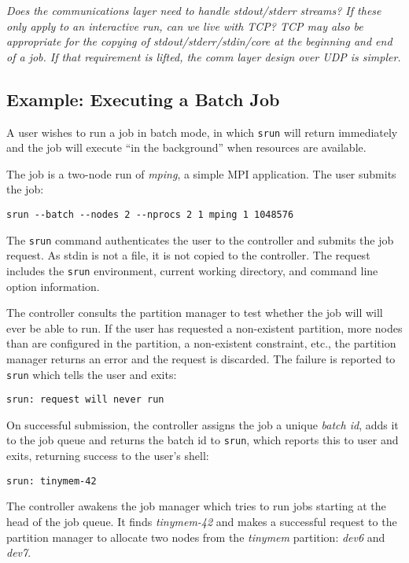 {\em Does the communications layer need to handle stdout/stderr streams?
If these only apply to an interactive run, can we live with TCP?
TCP may also be appropriate for the copying of stdout/stderr/stdin/core
at the beginning and end of a job.  If that requirement is lifted,
the comm layer design over UDP is simpler.}

\subsection{Example:  Executing a Batch Job}

A user wishes to run a job in batch mode, in which {\tt srun} will return 
immediately and the job will execute ``in the background'' when resources
are available.

The job is a two-node run of {\em mping}, a simple MPI application.
The user submits the job:
\begin{verbatim}
srun --batch --nodes 2 --nprocs 2 1 mping 1 1048576
\end{verbatim}

The {\tt srun} command authenticates the user to the controller and submits
the job request.  As stdin is not a file, it is not copied to the controller.
The request includes the {\tt srun} environment, current working directory, 
and command line option information.

The controller consults the partition manager to test whether the job will
will ever be able to run.  If the user has requested a non-existent partition,
more nodes than are configured in the partition, a non-existent constraint, 
etc., the partition manager returns an error and the request is discarded.
The failure is reported to {\tt srun} which tells the user and exits:
\begin{verbatim}
srun: request will never run
\end{verbatim}

On successful submission, the controller assigns the job a unique 
{\em batch id}, adds it to the job queue and returns the 
batch id to {\tt srun}, which reports this to user and exits, returning
success to the user's shell:

\begin{verbatim}
srun: tinymem-42
\end{verbatim}

The controller awakens the job manager which tries to run
jobs starting at the head of the job queue.  It finds {\em tinymem-42}
and makes a successful request to the partition manager to allocate 
two nodes from the {\em tinymem} partition: {\em dev6} and {\em dev7}.

